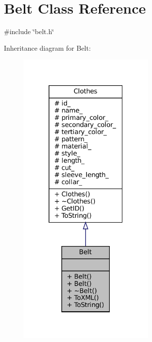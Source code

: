 \hypertarget{classBelt}{}\section{Belt Class Reference}
\label{classBelt}


{\ttfamily \#include \char`\"{}belt.\+h\char`\"{}}



Inheritance diagram for Belt\+:\nopagebreak
\begin{figure}[H]
\begin{center}
\leavevmode
\includegraphics[width=193pt]{classBelt__inherit__graph}
\end{center}
\end{figure}


